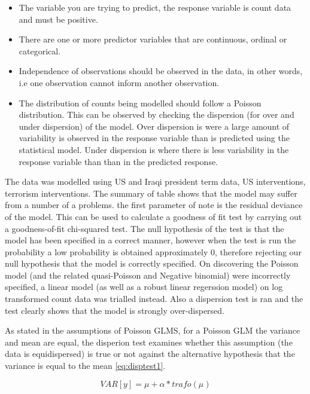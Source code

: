 \begin{itemize}
\item The variable you are trying to predict, the response variable is count data and must be positive.
\item There are one or more predictor variables that are continuous, ordinal or categorical.
\item Independence of observations should be observed in the data, in other words, i.e one observation cannot inform another observation.
\item The distribution of counts being modelled should follow a Poisson distribution. This can be observed by checking the dispersion (for over and under dispersion) of the model. Over dispersion is  were a large amount of variability is observed in the response variable than is predicted using the statistical model. Under dispersion is where there is less variability in the response variable than than in the predicted response.
\end{itemize}

The data was modelled using US and Iraqi president term data, US interventions, terrorism interventions. The summary of table  shows that the model may suffer from a number of a problems. the first parameter of note is the residual deviance of the model. This can be used to calculate a goodness of fit test by carrying out a goodness-of-fit chi-squared test. The null hypothesis of the test is that the model has been specified in a correct manner, however when the test is run the probability  a low probability is obtained  approximately 0, therefore rejecting our null hypothesis that the model is correctly specified. On discovering the Poisson model (and the related quasi-Poisson and Negative binomial) were incorrectly specified, a linear model (as well as a robust linear regerssion model) on log transformed count data was trialled instead. Also a dispersion test is ran and the test clearly shows that the model is strongly over-dispersed.

As stated in the assumptions of Poisson GLMS, for a Poisson GLM the variance and mean are equal, the disperion test \citep{AerRPack} examines whether this assumption (the data is equidispersed) is true or not against the alternative hypothesis  that the variance is equal to the mean \ref{eq:disptest1}.

\begin{equation} VAR[y] = \mu + \alpha * trafo(\mu)   \label{eq:disptest1}  \end{equation}


